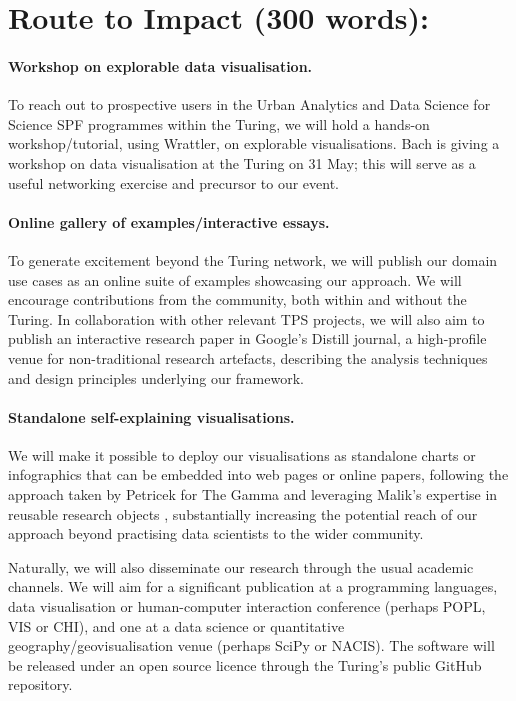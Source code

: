 \section*{Route to Impact (300 words):}

\paragraph{Workshop on explorable data visualisation.} To reach out to
prospective users in the Urban Analytics and Data Science for Science SPF
programmes within the Turing, we will hold a hands-on workshop/tutorial, using
Wrattler, on explorable visualisations. Bach is giving a workshop on data
visualisation at the Turing on 31 May; this will serve as a useful networking
exercise and precursor to our event.

\paragraph{Online gallery of examples/interactive essays.} To generate
excitement beyond the Turing network, we will publish our domain use cases as an
online suite of examples showcasing our approach. We will encourage
contributions from the community, both within and without the Turing. In
collaboration with other relevant TPS projects, we will also aim to publish an
interactive research paper in Google's Distill \cite{goertler19} journal, a
high-profile venue for non-traditional research artefacts, describing the
analysis techniques and design principles underlying our framework.

\paragraph{Standalone self-explaining visualisations.} We will make it possible
to deploy our visualisations as standalone charts or infographics that can be
embedded into web pages or online papers, following the approach taken by
Petricek for The Gamma \cite{petricek17} and leveraging Malik's expertise in
reusable research objects \cite{yuan18}, substantially increasing the potential
reach of our approach beyond practising data scientists to the wider community.

\vspace{8pt}
Naturally, we will also disseminate our research through the usual academic
channels. We will aim for a significant publication at a programming languages,
data visualisation or human-computer interaction conference (perhaps POPL, VIS
or CHI), and one at a data science or quantitative geography/geovisualisation
venue (perhaps SciPy or NACIS). The software will be released under an open
source licence through the Turing's public GitHub repository.
